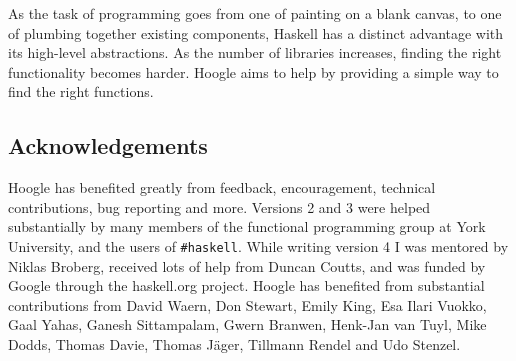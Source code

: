 \documentclass{tmr}
\begin{document}
As the task of programming goes from one of painting on a blank canvas, to one of plumbing together existing components, Haskell has a distinct advantage with its high-level abstractions. As the number of libraries increases, finding the right functionality becomes harder. Hoogle aims to help by providing a simple way to find the right functions.

\subsection{Acknowledgements}

Hoogle has benefited greatly from feedback, encouragement, technical contributions, bug reporting and more. Versions 2 and 3 were helped substantially by many members of the functional programming group at York University, and the users of \verb"#haskell". While writing version 4 I was mentored by Niklas Broberg, received lots of help from Duncan Coutts, and was funded by Google through the haskell.org project. Hoogle has benefited from substantial contributions from David Waern, Don Stewart, Emily King, Esa Ilari Vuokko, Gaal Yahas, Ganesh Sittampalam, Gwern Branwen, Henk-Jan van Tuyl, Mike Dodds, Thomas Davie, Thomas J\"{a}ger, Tillmann Rendel and Udo Stenzel.


\end{document}
